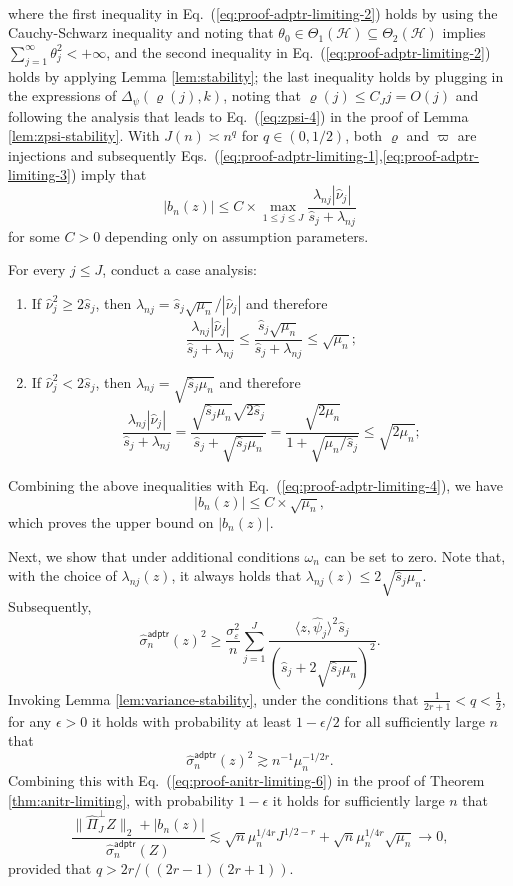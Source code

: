 \documentclass[aos]{imsart}
\renewcommand{\hat}{\widehat}
\newcommand{\mH}{\mathcal H}
\newcommand{\adptr}{\mathsf{adptr}}
\theoremstyle{plain}
\theoremstyle{definition}
\theoremstyle{definition}
\begin{document}
\begin{appendix}
{\begin{align}
\end{align}
where the first inequality in Eq.~(\ref{eq:proof-adptr-limiting-2}) holds by using the Cauchy-Schwarz inequality and noting that $\theta_0\in\Theta_1(\mH)\subseteq\Theta_2(\mH)$ implies $\sum_{j=1}^{\infty}\theta_j^2<+\infty$,
and the second inequality in Eq.~(\ref{eq:proof-adptr-limiting-2}) holds by applying Lemma \ref{lem:stability}; the last inequality holds by plugging in the expressions of $\Delta_\psi(\varrho(j),k)$,
noting that $\varrho(j)\leq C_J j=O(j)$
and following the analysis that leads to Eq.~(\ref{eq:zpsi-4}) in the proof of Lemma \ref{lem:zpsi-stability}.
With $J(n)\asymp n^q$ for $q\in(0,1/2)$, both $\varrho$ and $\varpi$ are injections and subsequently Eqs.~(\ref{eq:proof-adptr-limiting-1},\ref{eq:proof-adptr-limiting-3}) imply that
\begin{equation}
\big|b_n(z)\big| \leq C\times  \max_{1\leq j\leq J}\frac{\lambda_{nj}|\hat\nu_j|}{\hat s_j+\lambda_{nj}}
\label{eq:proof-adptr-limiting-4}
\end{equation}
for some $C>0$ depending only on assumption parameters. 
}

For every $j\leq J$, conduct a case analysis: 
\begin{enumerate}
\item If $\hat\nu_j^2\geq 2\hat s_j$, then $\lambda_{nj}=\hat s_j\sqrt{\mu_n}/|\hat\nu_j|$ and therefore
$$
\frac{\lambda_{nj}|\hat\nu_j|}{\hat s_j+\lambda_{nj}}\leq \frac{\hat s_j\sqrt{\mu_n}}{\hat s_j+\lambda_{nj}}\leq \sqrt{\mu_n};
$$
\item If $\hat\nu_j^2< 2\hat s_j$, then $\lambda_{nj}=\sqrt{\hat s_j\mu_n}$ and therefore
$$
\frac{\lambda_{nj}|\hat\nu_j|}{\hat s_j+\lambda_{nj}} = \frac{\sqrt{\hat s_j\mu_n}\sqrt{2\hat s_j}}{\hat s_j+\sqrt{\hat s_j\mu_n}} = \frac{\sqrt{2\mu_n}}{1+\sqrt{\mu_n/\hat s_j}}\leq \sqrt{2\mu_n};
$$
\end{enumerate}
Combining the above inequalities with Eq.~(\ref{eq:proof-adptr-limiting-4}), we have
$$
\big|b_n(z)\big| \leq C\times  \sqrt{\mu_n},
$$
which proves the upper bound on $|b_n(z)|$.

Next, we show that under additional conditions $\omega_n$ can be set to zero. Note that, with the choice of $\lambda_{nj}(z)$, it always holds that $\lambda_{nj}(z)\leq 2\sqrt{\hat s_j\mu_n}$.
Subsequently,
$$
\hat\sigma_n^\adptr(z)^2 \geq \frac{\sigma_\varepsilon^2}{n}\sum_{j=1}^J \frac{\langle z,\hat\psi_j\rangle^2\hat s_j}{(\hat s_j+2\sqrt{\hat s_j\mu_n})^2}.
$$
Invoking Lemma \ref{lem:variance-stability}, under the conditions that $\frac{1}{2r+1}<q<\frac{1}{2}$, for any $\epsilon>0$ it holds with probability at least $1-\epsilon/2$ for all sufficiently large $n$ that
$$
\hat\sigma_n^\adptr(z)^2 \gtrsim n^{-1}\mu_n^{-1/2r}.
$$
Combining this with Eq.~(\ref{eq:proof-anitr-limiting-6}) in the proof of Theorem \ref{thm:anitr-limiting}, with probability $1-\epsilon$ it holds for sufficiently large $n$ that
$$
\frac{\|\hat\Pi_J^\perp Z\|_2+|b_n(z)|}{\hat\sigma_n^\adptr(Z)} \lesssim \sqrt{n}\mu_n^{1/4r}J^{1/2-r} + \sqrt{n}\mu_n^{1/4r}\sqrt{\mu_n} \to 0,
$$
provided that $q>2r/((2r-1)(2r+1))$. 


\end{appendix}
\end{document}
